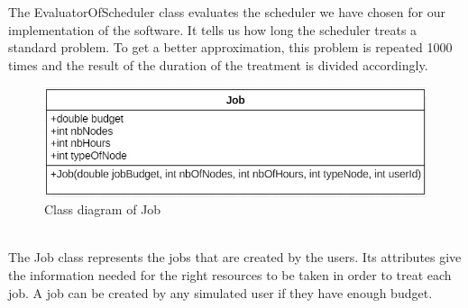 \documentclass [10 pt, a4 paper]{report}
\begin{document}
\noindent
The EvaluatorOfScheduler class evaluates the scheduler we have chosen for our implementation of the software. It tells us how long the scheduler treats a standard problem. To get a better approximation, this problem is repeated 1000 times and the result of the duration of the treatment is divided accordingly.

\clearpage

\begin{figure}[!htbp]
\centering
\includegraphics[width=1.2\textwidth]{Job.jpg}
\caption{\label{fig:image} Class diagram of Job}
\end{figure}
\\

\noindent
The Job class represents the jobs that are created by the users. Its attributes give the information needed for the right resources to be taken in order to treat each job. A job can be created by any simulated user if they have enough budget.

\\ \\
\end{document}
